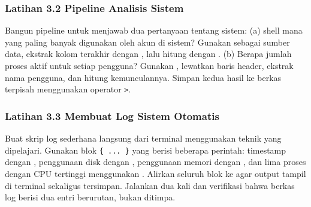 \subsubsection*{Latihan 3.2 Pipeline Analisis Sistem}
Bangun pipeline untuk menjawab dua pertanyaan tentang sistem: (a) shell mana yang paling banyak digunakan oleh akun di sistem? Gunakan  sebagai sumber data, ekstrak kolom terakhir dengan , lalu hitung dengan . (b) Berapa jumlah proses aktif untuk setiap pengguna? Gunakan , lewatkan baris header, ekstrak nama pengguna, dan hitung kemunculannya. Simpan kedua hasil ke berkas terpisah menggunakan operator \texttt{>}.


\subsubsection*{Latihan 3.3 Membuat Log Sistem Otomatis}
Buat skrip log sederhana langsung dari terminal menggunakan teknik yang dipelajari. Gunakan blok \texttt{\{ ... \}} yang berisi beberapa perintah: timestamp dengan , penggunaan disk dengan , penggunaan memori dengan , dan lima proses dengan CPU tertinggi menggunakan . Alirkan seluruh blok ke  agar output tampil di terminal sekaligus tersimpan. Jalankan dua kali dan verifikasi bahwa berkas log berisi dua entri berurutan, bukan ditimpa.


%
